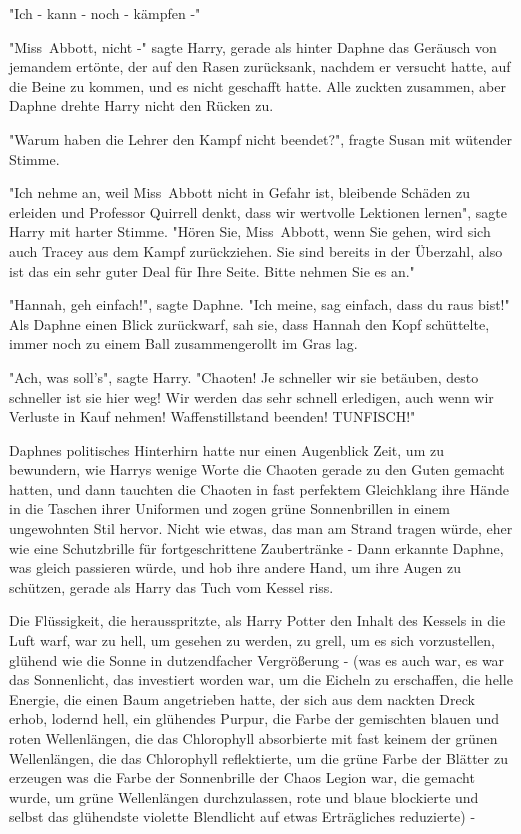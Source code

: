 {"Ich - kann - noch - kämpfen -"

"Miss~Abbott, nicht -" sagte Harry, gerade als hinter Daphne das Geräusch von jemandem ertönte, der auf den Rasen zurücksank, nachdem er versucht hatte, auf die Beine zu kommen, und es nicht geschafft hatte. Alle zuckten zusammen, aber Daphne drehte Harry nicht den Rücken zu.

"Warum haben die Lehrer den Kampf nicht beendet?", fragte Susan mit wütender Stimme.

"Ich nehme an, weil Miss~Abbott nicht in Gefahr ist, bleibende Schäden zu erleiden und Professor Quirrell denkt, dass wir wertvolle Lektionen lernen", sagte Harry mit harter Stimme. "Hören Sie, Miss~Abbott, wenn Sie gehen, wird sich auch Tracey aus dem Kampf zurückziehen. Sie sind bereits in der Überzahl, also ist das ein sehr guter Deal für Ihre Seite. Bitte nehmen Sie es an."

"Hannah, geh einfach!", sagte Daphne. "Ich meine, sag einfach, dass du raus bist!" Als Daphne einen Blick zurückwarf, sah sie, dass Hannah den Kopf schüttelte, immer noch zu einem Ball zusammengerollt im Gras lag.

"Ach, was soll's", sagte Harry. "Chaoten! Je schneller wir sie betäuben, desto schneller ist sie hier weg! Wir werden das sehr schnell erledigen, auch wenn wir Verluste in Kauf nehmen! Waffenstillstand beenden! TUNFISCH!"

Daphnes politisches Hinterhirn hatte nur einen Augenblick Zeit, um zu bewundern, wie Harrys wenige Worte die Chaoten gerade zu den Guten gemacht hatten, und dann tauchten die Chaoten in fast perfektem Gleichklang ihre Hände in die Taschen ihrer Uniformen und zogen grüne Sonnenbrillen in einem ungewohnten Stil hervor. Nicht wie etwas, das man am Strand tragen würde, eher wie eine Schutzbrille für fortgeschrittene Zaubertränke - Dann erkannte Daphne, was gleich passieren würde, und hob ihre andere Hand, um ihre Augen zu schützen, gerade als Harry das Tuch vom Kessel riss.

Die Flüssigkeit, die herausspritzte, als Harry Potter den Inhalt des Kessels in die Luft warf, war zu hell, um gesehen zu werden, zu grell, um es sich vorzustellen, glühend wie die Sonne in dutzendfacher Vergrößerung - (was es auch war, es war das Sonnenlicht, das investiert worden war, um die Eicheln zu erschaffen, die helle Energie, die einen Baum angetrieben hatte, der sich aus dem nackten Dreck erhob, lodernd hell, ein glühendes Purpur, die Farbe der gemischten blauen und roten Wellenlängen, die das Chlorophyll absorbierte mit fast keinem der grünen Wellenlängen, die das Chlorophyll reflektierte, um die grüne Farbe der Blätter zu erzeugen was die Farbe der Sonnenbrille der Chaos Legion war, die gemacht wurde, um grüne Wellenlängen durchzulassen, rote und blaue blockierte und selbst das glühendste violette Blendlicht auf etwas Erträgliches reduzierte) -

}
